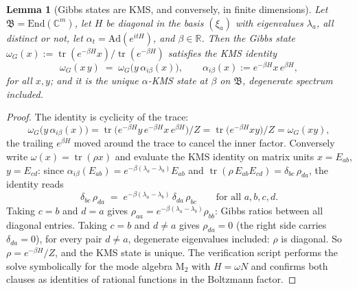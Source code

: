 \documentclass[11pt]{article}
\newtheorem{lemma}[theorem]{Lemma}
\theoremstyle{definition}
\theoremstyle{plain}
\providecommand{\C}{}\renewcommand{\C}{\mathbb{C}}
\providecommand{\End}{}\renewcommand{\End}{\mathrm{End}}
\providecommand{\Mat}{}\renewcommand{\Mat}{\mathrm{M}}
\providecommand{\R}{}\renewcommand{\R}{\mathbb{R}}
\providecommand{\tr}{}\renewcommand{\tr}{\operatorname{tr}}
\begin{document}
\begin{lemma}[Gibbs states are KMS, and conversely, in finite dimensions]\label{c:hawking.gibbs-states-are-kms-conversely-finite}
Let $\mathfrak{B} = \End(\C^m)$, let $H$ be diagonal in the basis $(\xi_a)$ with eigenvalues $\lambda_a$, all distinct or not, let $\alpha_t = \mathrm{Ad}(e^{itH})$, and $\beta \in \R$. Then the Gibbs state $\omega_G(x) := \tr(e^{-\beta H}x)/\tr(e^{-\beta H})$ satisfies the KMS identity
\[
\omega_G(x\,y) \;=\; \omega_G\bigl(y\,\alpha_{i\beta}(x)\bigr), \qquad \alpha_{i\beta}(x) := e^{-\beta H}x\,e^{\beta H},
\]
for all $x, y$; and it is the \emph{unique} $\alpha$-KMS state at $\beta$ on $\mathfrak{B}$, degenerate spectrum included.
\end{lemma}
\begin{proof}
The identity is cyclicity of the trace:
\[
\omega_G\bigl(y\,\alpha_{i\beta}(x)\bigr) = \tr\bigl(e^{-\beta H}y\,e^{-\beta H}x\,e^{\beta H}\bigr)/Z = \tr\bigl(e^{-\beta H}xy\bigr)/Z = \omega_G(xy),
\]
the trailing $e^{\beta H}$ moved around the trace to cancel the inner factor. Conversely write $\omega(x) = \tr(\rho x)$ and evaluate the KMS identity on matrix units $x = E_{ab}$, $y = E_{cd}$: since $\alpha_{i\beta}(E_{ab}) = e^{-\beta(\lambda_a - \lambda_b)}E_{ab}$ and $\tr(\rho\,E_{ab}E_{cd}) = \delta_{bc}\,\rho_{da}$, the identity reads
\[
\delta_{bc}\,\rho_{da} \;=\; e^{-\beta(\lambda_a - \lambda_b)}\,\delta_{da}\,\rho_{bc}
\qquad \text{for all } a, b, c, d.
\]
Taking $c = b$ and $d = a$ gives $\rho_{aa} = e^{-\beta(\lambda_a - \lambda_b)}\rho_{bb}$: Gibbs ratios between all diagonal entries. Taking $c = b$ and $d \neq a$ gives $\rho_{da} = 0$ (the right side carries $\delta_{da} = 0$), for every pair $d \neq a$, degenerate eigenvalues included: $\rho$ is diagonal. So $\rho = e^{-\beta H}/Z$, and the KMS state is unique. The verification script performs the solve symbolically for the mode algebra $\Mat_2$ with $H = \omega N$ and confirms both clauses as identities of rational functions in the Boltzmann factor.

\end{proof}
\end{document}
